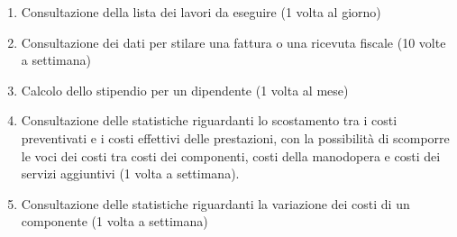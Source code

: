 \begin{enumerate}
			\item Consultazione della lista dei lavori da eseguire (1 volta al giorno)
			\item Consultazione dei dati per stilare una fattura o una ricevuta fiscale (10 volte a settimana)
			\item Calcolo dello stipendio per un dipendente (1 volta al mese)
			\item Consultazione delle statistiche riguardanti lo scostamento tra i costi preventivati e i costi effettivi delle prestazioni, con la possibilità di scomporre le voci dei costi tra costi dei componenti, costi della manodopera e costi dei servizi aggiuntivi (1 volta a settimana).
			\item Consultazione delle statistiche riguardanti la variazione dei costi di un componente (1 volta a settimana)
			
		\end{enumerate}
